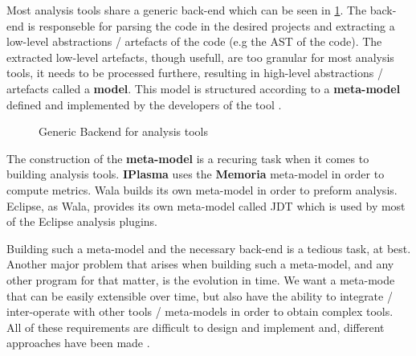         Most analysis tools share a generic back-end which can be seen in \ref{fig:analysisArchitecture}. The back-end is responseble
for parsing the code in the desired projects and extracting a low-level abstractions / artefacts of the code (e.g the AST of the code). The extracted low-level artefacts,
though usefull, are too granular for most analysis tools, it needs to be processed furthere, resulting in high-level abstractions / artefacts called a \textbf{model}.  This
model is structured according to a \textbf{meta-model} defined and implemented by the developers of the tool \cite{paper:xcore}.

        \begin{figure}
        \centering
        \caption{Generic Backend for analysis tools \cite{paper:xcore}}
        \label{fig:analysisArchitecture}
        \end{figure}

        The construction of the \textbf{meta-model} is a recuring task when it comes to building analysis tools. \textbf{IPlasma} \cite{tools:iPlasma} uses the \textbf{Memoria}
meta-model in order to compute metrics. Wala \cite{tools:wala} builds its own meta-model in order to preform analysis. Eclipse, as Wala, provides its own meta-model called JDT
\cite{tools:JDT} which is used by most of the Eclipse analysis plugins. 
        
        Building such a meta-model and the necessary back-end is a tedious task, at best. Another major problem that arises when building such a meta-model, and any other program
for that matter, is the evolution in time. We want a meta-mode that can be easily extensible over time, but also have the ability to integrate / inter-operate with other tools / meta-models
in order to obtain complex tools. All of these requirements are difficult to design and implement and, different approaches have been made \cite{tools:fame} \cite{paper:xcore}.


